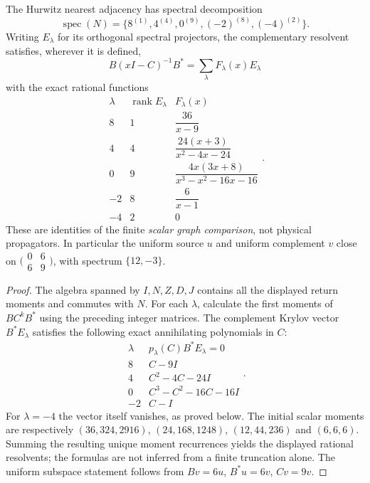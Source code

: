 \documentclass[11pt]{article}
\begin{document}
\begin{theorem}
\label{p1b:thm:v3027-600-hurwitz-mode-resolvent}
The Hurwitz nearest adjacency has spectral decomposition
\[
 \operatorname{spec}(N)=\{8^{(1)},4^{(4)},0^{(9)},(-2)^{(8)},(-4)^{(2)}\}.
\]
Writing $E_\lambda$ for its orthogonal spectral projectors, the
complementary resolvent satisfies, wherever it is defined,
\[
\boxed{B(xI-C)^{-1}B^*=\sum_{\lambda}F_\lambda(x)E_\lambda}
\]
with the exact rational functions
\[
\begin{array}{c|c|l}
\lambda&\operatorname{rank}E_\lambda&F_\lambda(x)\\\hline
8&1&\dfrac{36}{x-9}\\[3pt]
4&4&\dfrac{24(x+3)}{x^2-4x-24}\\[3pt]
0&9&\dfrac{4x(3x+8)}{x^3-x^2-16x-16}\\[3pt]
-2&8&\dfrac{6}{x-1}\\[3pt]
-4&2&0
\end{array}.
\]
These are identities of the finite \emph{scalar graph comparison},
not physical propagators. In particular the uniform source $u$ and
uniform complement $v$ close on
$\bigl(\begin{smallmatrix}0&6\\6&9\end{smallmatrix}\bigr)$,
with spectrum $\{12,-3\}$.
\end{theorem}
\begin{proof}
The algebra spanned by $I,N,Z,D,J$ contains all the displayed return
moments and commutes with $N$. For each $\lambda$, calculate the
first moments of $BC^kB^*$ using the preceding integer matrices.
The complement Krylov vector $B^*E_\lambda$ satisfies the following
exact annihilating polynomials in $C$:
\[
\begin{array}{c|c}
\lambda&p_\lambda(C)B^*E_\lambda=0\\\hline
8&C-9I\\
4&C^2-4C-24I\\
0&C^3-C^2-16C-16I\\
-2&C-I
\end{array}.
\]
For $\lambda=-4$ the vector itself vanishes, as proved below.
The initial scalar moments are respectively
$(36,324,2916)$, $(24,168,1248)$, $(12,44,236)$ and $(6,6,6)$.
Summing the resulting unique moment recurrences yields the displayed
rational resolvents; the formulas are not inferred from a finite
truncation alone. The uniform subspace statement follows from
$Bv=6u$, $B^*u=6v$, $Cv=9v$.
\end{proof}
\end{document}
